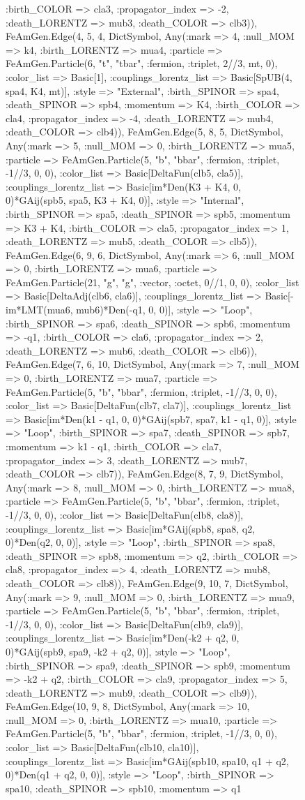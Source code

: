 \documentclass{revtex4}
\begin{document}
\begin{figure}[!htb]
\begin{center}
{:birth_COLOR => cla3, :propagator_index => -2, :death_LORENTZ => mub3, :death_COLOR => clb3)), FeAmGen.Edge(4, 5, 4, Dict{Symbol, Any}(:mark => 4, :null_MOM => k4, :birth_LORENTZ => mua4, :particle => FeAmGen.Particle(6, "t", "tbar", :fermion, :triplet, 2//3, mt, 0), :color_list => Basic[1], :couplings_lorentz_list => Basic[SpUB(4, spa4, K4, mt)], :style => "External", :birth_SPINOR => spa4, :death_SPINOR => spb4, :momentum => K4, :birth_COLOR => cla4, :propagator_index => -4, :death_LORENTZ => mub4, :death_COLOR => clb4)), FeAmGen.Edge(5, 8, 5, Dict{Symbol, Any}(:mark => 5, :null_MOM => 0, :birth_LORENTZ => mua5, :particle => FeAmGen.Particle(5, "b", "bbar", :fermion, :triplet, -1//3, 0, 0), :color_list => Basic[DeltaFun(clb5, cla5)], :couplings_lorentz_list => Basic[im*Den(K3 + K4, 0, 0)*GAij(spb5, spa5, K3 + K4, 0)], :style => "Internal", :birth_SPINOR => spa5, :death_SPINOR => spb5, :momentum => K3 + K4, :birth_COLOR => cla5, :propagator_index => 1, :death_LORENTZ => mub5, :death_COLOR => clb5)), FeAmGen.Edge(6, 9, 6, Dict{Symbol, Any}(:mark => 6, :null_MOM => 0, :birth_LORENTZ => mua6, :particle => FeAmGen.Particle(21, "g", "g", :vector, :octet, 0//1, 0, 0), :color_list => Basic[DeltaAdj(clb6, cla6)], :couplings_lorentz_list => Basic[-im*LMT(mua6, mub6)*Den(-q1, 0, 0)], :style => "Loop", :birth_SPINOR => spa6, :death_SPINOR => spb6, :momentum => -q1, :birth_COLOR => cla6, :propagator_index => 2, :death_LORENTZ => mub6, :death_COLOR => clb6)), FeAmGen.Edge(7, 6, 10, Dict{Symbol, Any}(:mark => 7, :null_MOM => 0, :birth_LORENTZ => mua7, :particle => FeAmGen.Particle(5, "b", "bbar", :fermion, :triplet, -1//3, 0, 0), :color_list => Basic[DeltaFun(clb7, cla7)], :couplings_lorentz_list => Basic[im*Den(k1 - q1, 0, 0)*GAij(spb7, spa7, k1 - q1, 0)], :style => "Loop", :birth_SPINOR => spa7, :death_SPINOR => spb7, :momentum => k1 - q1, :birth_COLOR => cla7, :propagator_index => 3, :death_LORENTZ => mub7, :death_COLOR => clb7)), FeAmGen.Edge(8, 7, 9, Dict{Symbol, Any}(:mark => 8, :null_MOM => 0, :birth_LORENTZ => mua8, :particle => FeAmGen.Particle(5, "b", "bbar", :fermion, :triplet, -1//3, 0, 0), :color_list => Basic[DeltaFun(clb8, cla8)], :couplings_lorentz_list => Basic[im*GAij(spb8, spa8, q2, 0)*Den(q2, 0, 0)], :style => "Loop", :birth_SPINOR => spa8, :death_SPINOR => spb8, :momentum => q2, :birth_COLOR => cla8, :propagator_index => 4, :death_LORENTZ => mub8, :death_COLOR => clb8)), FeAmGen.Edge(9, 10, 7, Dict{Symbol, Any}(:mark => 9, :null_MOM => 0, :birth_LORENTZ => mua9, :particle => FeAmGen.Particle(5, "b", "bbar", :fermion, :triplet, -1//3, 0, 0), :color_list => Basic[DeltaFun(clb9, cla9)], :couplings_lorentz_list => Basic[im*Den(-k2 + q2, 0, 0)*GAij(spb9, spa9, -k2 + q2, 0)], :style => "Loop", :birth_SPINOR => spa9, :death_SPINOR => spb9, :momentum => -k2 + q2, :birth_COLOR => cla9, :propagator_index => 5, :death_LORENTZ => mub9, :death_COLOR => clb9)), FeAmGen.Edge(10, 9, 8, Dict{Symbol, Any}(:mark => 10, :null_MOM => 0, :birth_LORENTZ => mua10, :particle => FeAmGen.Particle(5, "b", "bbar", :fermion, :triplet, -1//3, 0, 0), :color_list => Basic[DeltaFun(clb10, cla10)], :couplings_lorentz_list => Basic[im*GAij(spb10, spa10, q1 + q2, 0)*Den(q1 + q2, 0, 0)], :style => "Loop", :birth_SPINOR => spa10, :death_SPINOR => spb10, :momentum => q1 }
\end{center}
\end{figure}
\end{document}
